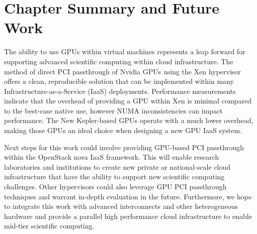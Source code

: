 \section{Chapter Summary and Future Work}

The ability to use GPUs within virtual machines represents a leap forward for supporting advanced scientific computing within cloud infrastructure. The method of direct PCI passthrough of Nvidia GPUs using the Xen hypervisor offers a clean, reproducible solution that can be implemented within many Infrastructure-as-a-Service (IaaS) deployments. Performance measurements indicate that the overhead of providing a GPU within Xen is minimal compared to the best-case native use, however NUMA inconsistencies can impact performance. The New Kepler-based GPUs operate with a much lower overhead, making those GPUs an ideal choice when designing a new GPU IaaS system. 

Next steps for this work could involve providing GPU-based PCI passthrough within the OpenStack nova IaaS framework. This will enable research laboratories and institutions to create new private or national-scale cloud infrastructure that have the ability to support new scientific computing challenges.  Other hypervisors could also leverage GPU PCI passthrough techniques and warrant in-depth evaluation in the future. Furthermore, we hope to integrate this work with advanced interconnects and other heterogeneous hardware and provide a parallel high performance cloud infrastructure to enable mid-tier scientific computing. 


